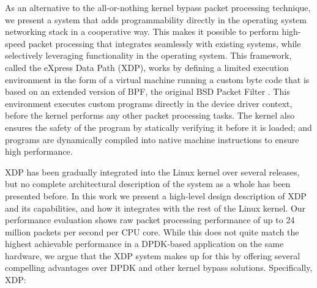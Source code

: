 \documentclass[sigconf]{acmart}
\begin{document}
As an alternative to the all-or-nothing kernel bypass packet processing
technique, we present a system that adds programmability directly in the
operating system networking stack in a cooperative way. This makes it possible
to perform high-speed packet processing that integrates seamlessly with existing
systems, while selectively leveraging functionality in the operating system.
This framework, called the eXpress Data Path (XDP), works by defining a limited
execution environment in the form of a virtual machine running a custom byte code
that is based on an extended version of BPF, the original BSD Packet Filter
\cite{mccanne_bsd_1993}. This environment executes custom programs directly in
the device driver context, before the kernel performs any other packet processing
tasks. The kernel also ensures the safety of the program by statically verifying
it before it is loaded; and programs are dynamically compiled into native machine
instructions to ensure high performance.

XDP has been gradually integrated into the Linux kernel over several releases,
but no complete architectural description of the system as a whole has been
presented before. In this work we present a high-level design description of XDP
and its capabilities, and how it integrates with the rest of the Linux kernel.
Our performance evaluation shows raw packet processing performance of up to 24
million packets per second per CPU core. While this does not quite match the
highest achievable performance in a DPDK-based application on the same hardware,
we argue that the XDP system makes up for this by offering several compelling
advantages over DPDK and other kernel bypass solutions. Specifically, XDP:
\end{document}

